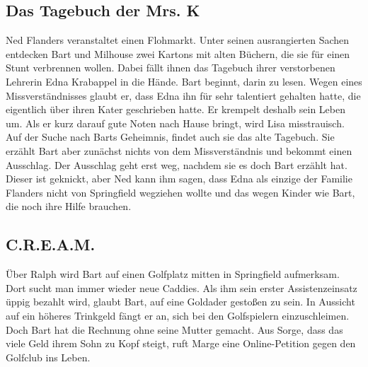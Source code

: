 \subsection{Das Tagebuch der Mrs. K}
Ned Flanders veranstaltet einen Flohmarkt. Unter seinen ausrangierten Sachen entdecken Bart und Milhouse zwei Kartons mit alten Büchern, die sie für einen Stunt verbrennen wollen. Dabei fällt ihnen das Tagebuch ihrer verstorbenen Lehrerin Edna Krabappel in die Hände. Bart beginnt, darin zu lesen. Wegen eines Missverständnisses glaubt er, dass Edna ihn für sehr talentiert gehalten hatte, die eigentlich über ihren Kater geschrieben hatte. Er krempelt deshalb sein Leben um. Als er kurz darauf gute Noten nach Hause bringt, wird Lisa misstrauisch. Auf der Suche nach Barts Geheimnis, findet auch sie das alte Tagebuch. Sie erzählt Bart aber zunächst nichts von dem Missverständnis und bekommt einen Ausschlag. Der Ausschlag geht erst weg, nachdem sie es doch Bart erzählt hat. Dieser ist geknickt, aber Ned kann ihm sagen, dass Edna als einzige der Familie Flanders nicht von Springfield wegziehen wollte und das wegen Kinder wie Bart, die noch ihre Hilfe brauchen.


\subsection{C.R.E.A.M.}
Über Ralph wird Bart auf einen Golfplatz mitten in Springfield aufmerksam. Dort sucht man immer wieder neue Caddies. Als ihm sein erster Assistenzeinsatz üppig bezahlt wird, glaubt Bart, auf eine Goldader gestoßen zu sein. In Aussicht auf ein höheres Trinkgeld fängt er an, sich bei den Golfspielern einzuschleimen. Doch Bart hat die Rechnung ohne seine Mutter gemacht. Aus Sorge, dass das viele Geld ihrem Sohn zu Kopf steigt, ruft Marge eine Online-Petition gegen den Golfclub ins Leben.


